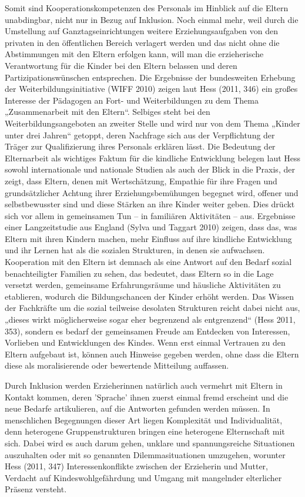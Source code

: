 Somit sind Kooperationskompetenzen des Personals im Hinblick auf die Eltern unabdingbar, nicht nur in Bezug auf Inklusion. 
Noch einmal mehr, weil durch die Umstellung auf Ganztagseinrichtungen weitere Erziehungsaufgaben von den privaten in den öffentlichen Bereich verlagert werden und das nicht ohne die Abstimmungen mit den Eltern erfolgen kann, will man die erzieherische Verantwortung für die Kinder bei den Eltern belassen und deren Partizipationswünschen entsprechen. Die Ergebnisse der bundesweiten Erhebung der Weiterbildungsinitiative (WIFF 2010) zeigen laut Hess (2011, 346) ein großes Interesse der Pädagogen an Fort- und Weiterbildungen zu dem Thema „Zusammenarbeit mit den Eltern“. Selbiges steht bei den Weiterbildungsangeboten an zweiter Stelle und wird nur von dem Thema „Kinder unter drei Jahren“ getoppt, deren Nachfrage sich aus der Verpflichtung der Träger zur Qualifizierung ihres Personals erklären lässt. Die Bedeutung der Elternarbeit als wichtiges Faktum für die kindliche Entwicklung belegen laut Hess sowohl internationale und nationale Studien als auch der Blick in die Praxis, der zeigt, dass Eltern, denen mit Wertschätzung, Empathie für ihre Fragen und grundsätzlicher Achtung ihrer Erziehungsbemühungen begegnet wird, offener und selbstbewusster sind und diese Stärken an ihre Kinder weiter geben. Dies drückt sich vor allem in gemeinsamen Tun -- in familiären Aktivitäten -- aus. 
Ergebnisse einer Langzeitstudie aus England (Sylva und Taggart 2010) zeigen, dass das, was Eltern mit ihren Kindern machen, mehr Einfluss auf ihre kindliche Entwicklung und ihr Lernen hat als die sozialen Strukturen, in denen sie aufwachsen.  
Kooperation mit den Eltern ist demnach als eine Antwort auf den Bedarf sozial benachteiligter Familien zu sehen, das bedeutet, dass Eltern so in die Lage versetzt werden, gemeinsame Erfahrungsräume und häusliche Aktivitäten zu etablieren, wodurch die Bildungschancen der Kinder erhöht werden. Das Wissen der Fachkräfte um die sozial teilweise desolaten Strukturen reicht dabei nicht aus, „dieses wirkt möglicherweise sogar eher begrenzend als entgrenzend“ (Hess 2011, 353), sondern es bedarf der gemeinsamen Freude am Entdecken von Interessen, Vorlieben und Entwicklungen des Kindes. Wenn erst einmal Vertrauen zu den Eltern aufgebaut ist, können auch Hinweise gegeben werden, ohne dass die Eltern diese als moralisierende oder bewertende Mitteilung auffassen.

Durch Inklusion werden Erzieherinnen natürlich auch vermehrt mit Eltern in Kontakt kommen, deren 'Sprache' ihnen zuerst einmal fremd erscheint und die neue Bedarfe artikulieren, auf die Antworten gefunden werden müssen. In menschlichen Begegnungen dieser Art liegen Komplexität und Individualität, denn heterogene Gruppenstrukturen bringen eine heterogene Elternschaft mit sich. Dabei wird es auch darum gehen, unklare und spannungsreiche Situationen auszuhalten oder mit so genannten Dilemmasituationen umzugehen, worunter Hess (2011, 347) Interessenkonflikte zwischen der Erzieherin und Mutter, Verdacht auf Kindeswohlgefährdung und Umgang mit mangelnder elterlicher Präsenz versteht. 

